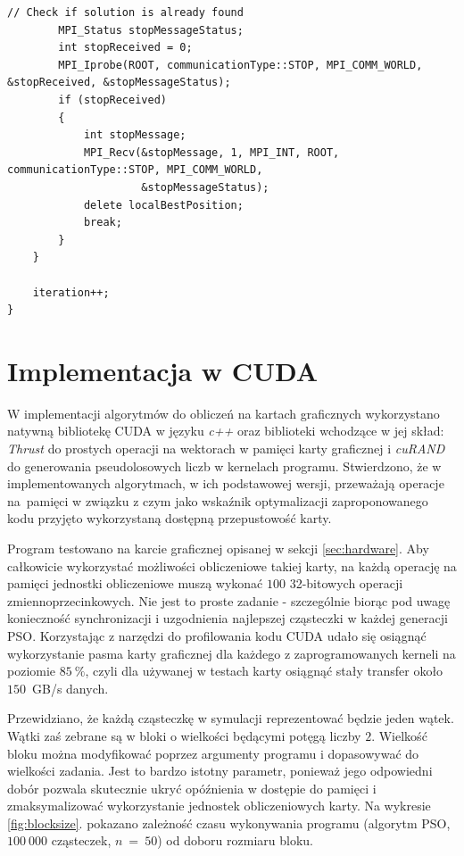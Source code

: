 \documentclass[11pt, a4paper, oneside]{article}
\begin{document}
\begin{lstlisting}[style=mycpp, label=code:pso_before, caption={Schemat komunikacji MPI w metodzie Monte Carlo.}]
        // Check if solution is already found
        MPI_Status stopMessageStatus;
        int stopReceived = 0;
        MPI_Iprobe(ROOT, communicationType::STOP, MPI_COMM_WORLD, &stopReceived, &stopMessageStatus);
        if (stopReceived)
        {
            int stopMessage;
            MPI_Recv(&stopMessage, 1, MPI_INT, ROOT, communicationType::STOP, MPI_COMM_WORLD,
                     &stopMessageStatus);
            delete localBestPosition;
            break;
        }
    }

    iteration++;
}
\end{lstlisting}
             
\section{Implementacja w CUDA}
W implementacji algorytmów do obliczeń na kartach graficznych wykorzystano natywną bibliotekę CUDA w języku \textit{c++} oraz biblioteki wchodzące w jej skład: \textit{Thrust} do prostych operacji na wektorach w pamięci karty graficznej i \textit{cuRAND} do generowania pseudolosowych liczb w kernelach programu. Stwierdzono, że w implementowanych algorytmach, w ich podstawowej wersji, przeważają operacje na~pamięci w związku z czym jako wskaźnik optymalizacji zaproponowanego kodu przyjęto wykorzystaną dostępną przepustowość karty.

Program testowano na karcie graficznej opisanej w sekcji \ref{sec:hardware}. Aby całkowicie wykorzystać możliwości obliczeniowe takiej karty, na każdą operację na pamięci jednostki obliczeniowe muszą wykonać $100$ 32-bitowych operacji zmiennoprzecinkowych. Nie jest to proste zadanie - szczególnie biorąc pod uwagę konieczność synchronizacji i uzgodnienia najlepszej cząsteczki w każdej generacji PSO. Korzystając z narzędzi do profilowania kodu CUDA udało się osiągnąć wykorzystanie pasma karty graficznej dla każdego z zaprogramowanych kerneli na poziomie $85 \ \%$, czyli dla używanej w testach karty osiągnąć stały transfer około $150$~GB/s danych.

Przewidziano, że każdą cząsteczkę w symulacji reprezentować będzie jeden wątek. Wątki zaś zebrane są w bloki o wielkości będącymi potęgą liczby $2$. Wielkość bloku można modyfikować poprzez argumenty programu i dopasowywać do wielkości zadania. Jest to bardzo istotny parametr, ponieważ jego odpowiedni dobór pozwala skutecznie ukryć opóźnienia w dostępie do pamięci i zmaksymalizować wykorzystanie jednostek obliczeniowych karty. Na wykresie \ref{fig:blocksize}. pokazano zależność czasu wykonywania programu (algorytm PSO, $100 \ 000$ cząsteczek, $n \ = \ 50$) od doboru rozmiaru bloku.
\end{document}
